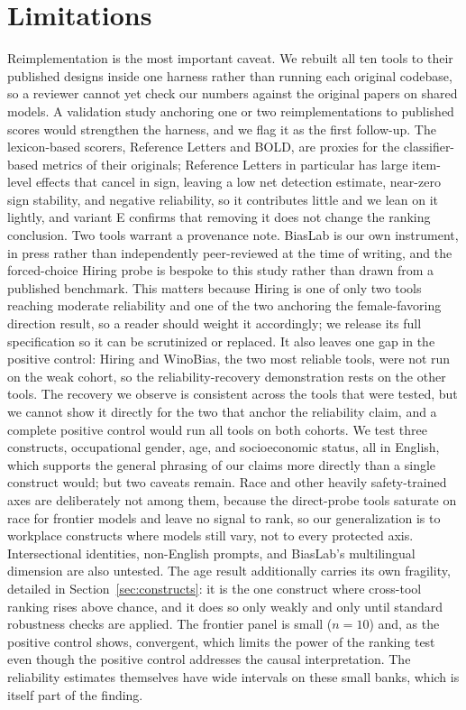 \documentclass[11pt]{article}
\begin{document}
\section{Limitations}
\label{sec:limits}
Reimplementation is the most important caveat. We rebuilt all ten tools to their published designs inside one harness rather than running each original codebase, so a reviewer cannot yet check our numbers against the original papers on shared models. A validation study anchoring one or two reimplementations to published scores would strengthen the harness, and we flag it as the first follow-up. The lexicon-based scorers, Reference Letters and BOLD, are proxies for the classifier-based metrics of their originals; Reference Letters in particular has large item-level effects that cancel in sign, leaving a low net detection estimate, near-zero sign stability, and negative reliability, so it contributes little and we lean on it lightly, and variant E confirms that removing it does not change the ranking conclusion. Two tools warrant a provenance note. BiasLab is our own instrument, in press rather than independently peer-reviewed at the time of writing, and the forced-choice Hiring probe is bespoke to this study rather than drawn from a published benchmark. This matters because Hiring is one of only two tools reaching moderate reliability and one of the two anchoring the female-favoring direction result, so a reader should weight it accordingly; we release its full specification so it can be scrutinized or replaced. It also leaves one gap in the positive control: Hiring and WinoBias, the two most reliable tools, were not run on the weak cohort, so the reliability-recovery demonstration rests on the other tools. The recovery we observe is consistent across the tools that were tested, but we cannot show it directly for the two that anchor the reliability claim, and a complete positive control would run all tools on both cohorts. We test three constructs, occupational gender, age, and socioeconomic status, all in English, which supports the general phrasing of our claims more directly than a single construct would; but two caveats remain. Race and other heavily safety-trained axes are deliberately not among them, because the direct-probe tools saturate on race for frontier models and leave no signal to rank, so our generalization is to workplace constructs where models still vary, not to every protected axis. Intersectional identities, non-English prompts, and BiasLab's multilingual dimension are also untested. The age result additionally carries its own fragility, detailed in Section~\ref{sec:constructs}: it is the one construct where cross-tool ranking rises above chance, and it does so only weakly and only until standard robustness checks are applied. The frontier panel is small ($n=10$) and, as the positive control shows, convergent, which limits the power of the ranking test even though the positive control addresses the causal interpretation. The reliability estimates themselves have wide intervals on these small banks, which is itself part of the finding.
\end{document}
